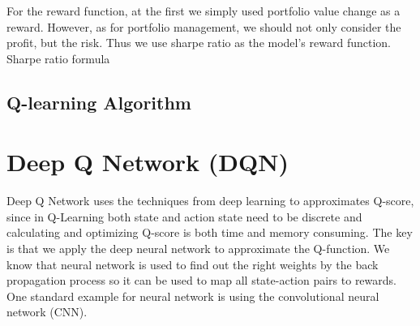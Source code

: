 For the reward function, at the first we simply used portfolio value change as a reward. However, as for portfolio management, we should not only consider the profit, but the risk. Thus we use sharpe ratio as the model’s reward function. Sharpe ratio formula 

\subsection{Q-learning Algorithm}
\def\skipl{0.2in}
\vspace{\skipl}
\vspace{\skipl}

\section{Deep Q Network (DQN)}
Deep Q Network uses the techniques from deep learning to approximates Q-score, since in Q-Learning both state and action state need to be discrete and calculating and optimizing Q-score is both time and memory consuming. The key is that we apply the deep neural network to approximate the Q-function. We know that neural network is used to find out the right weights by the back propagation process so it can be used to map all state-action pairs to rewards. One standard example for neural network is using the convolutional neural network (CNN). 

